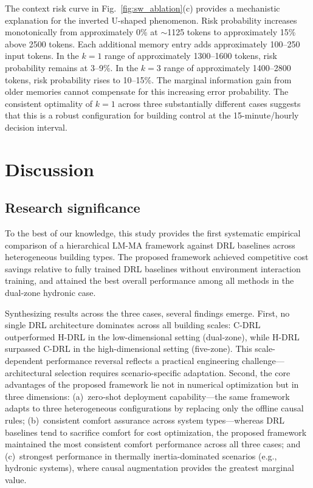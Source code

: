 \documentclass[a4paper]{cas-sc}
\begin{document}
The context risk curve in Fig.~\ref{fig:sw_ablation}(c) provides a mechanistic explanation for the inverted U-shaped phenomenon. Risk probability increases monotonically from approximately 0\% at ${\sim}$1125 tokens to approximately 15\% above 2500 tokens. Each additional memory entry adds approximately 100--250 input tokens. In the $k=1$ range of approximately 1300--1600 tokens, risk probability remains at 3--9\%. In the $k=3$ range of approximately 1400--2800 tokens, risk probability rises to 10--15\%. The marginal information gain from older memories cannot compensate for this increasing error probability. The consistent optimality of $k=1$ across three substantially different cases suggests that this is a robust configuration for building control at the 15-minute/hourly decision interval.

\section{Discussion}
\label{sec:discussion}

\subsection{Research significance}

To the best of our knowledge, this study provides the first systematic empirical comparison of a hierarchical LM-MA framework against DRL baselines across heterogeneous building types. The proposed framework achieved competitive cost savings relative to fully trained DRL baselines without environment interaction training, and attained the best overall performance among all methods in the dual-zone hydronic case.

Synthesizing results across the three cases, several findings emerge. First, no single DRL architecture dominates across all building scales: C-DRL outperformed H-DRL in the low-dimensional setting (dual-zone), while H-DRL surpassed C-DRL in the high-dimensional setting (five-zone). This scale-dependent performance reversal reflects a practical engineering challenge---architectural selection requires scenario-specific adaptation. Second, the core advantages of the proposed framework lie not in numerical optimization but in three dimensions: (a)~zero-shot deployment capability---the same framework adapts to three heterogeneous configurations by replacing only the offline causal rules; (b)~consistent comfort assurance across system types---whereas DRL baselines tend to sacrifice comfort for cost optimization, the proposed framework maintained the most consistent comfort performance across all three cases; and (c)~strongest performance in thermally inertia-dominated scenarios (e.g., hydronic systems), where causal augmentation provides the greatest marginal value.
\end{document}
